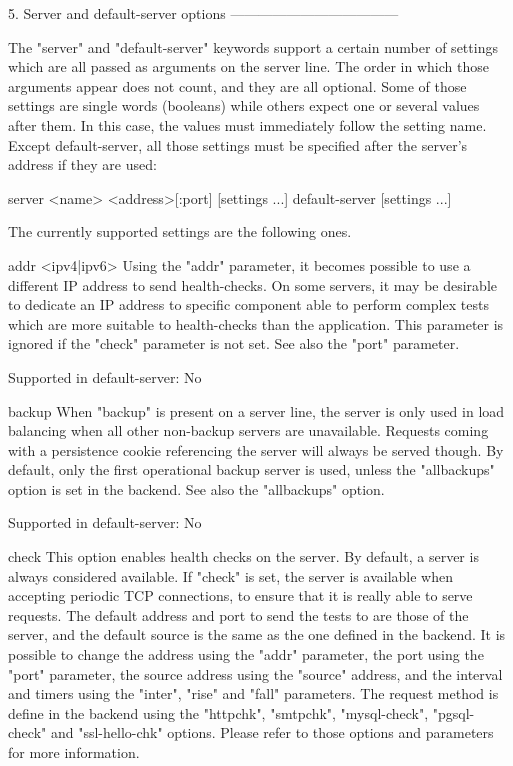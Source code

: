 5. Server and default-server options
------------------------------------

The "server" and "default-server" keywords support a certain number of settings
which are all passed as arguments on the server line. The order in which those
arguments appear does not count, and they are all optional. Some of those
settings are single words (booleans) while others expect one or several values
after them. In this case, the values must immediately follow the setting name.
Except default-server, all those settings must be specified after the server's
address if they are used:

  server <name> <address>[:port] [settings ...]
  default-server [settings ...]

The currently supported settings are the following ones.

addr <ipv4|ipv6>
  Using the "addr" parameter, it becomes possible to use a different IP address
  to send health-checks. On some servers, it may be desirable to dedicate an IP
  address to specific component able to perform complex tests which are more
  suitable to health-checks than the application. This parameter is ignored if
  the "check" parameter is not set. See also the "port" parameter.

  Supported in default-server: No

backup
  When "backup" is present on a server line, the server is only used in load
  balancing when all other non-backup servers are unavailable. Requests coming
  with a persistence cookie referencing the server will always be served
  though. By default, only the first operational backup server is used, unless
  the "allbackups" option is set in the backend. See also the "allbackups"
  option.

  Supported in default-server: No

check
  This option enables health checks on the server. By default, a server is
  always considered available. If "check" is set, the server is available when
  accepting periodic TCP connections, to ensure that it is really able to serve
  requests. The default address and port to send the tests to are those of the
  server, and the default source is the same as the one defined in the
  backend. It is possible to change the address using the "addr" parameter, the
  port using the "port" parameter, the source address using the "source"
  address, and the interval and timers using the "inter", "rise" and "fall"
  parameters. The request method is define in the backend using the "httpchk",
  "smtpchk", "mysql-check", "pgsql-check" and "ssl-hello-chk" options. Please
  refer to those options and parameters for more information.


